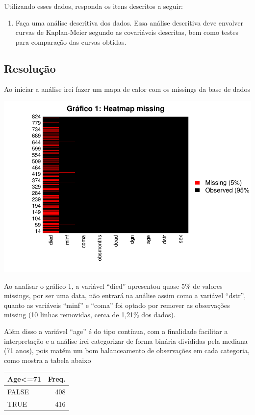 \documentclass[]{article}
\providecommand{\tightlist}{%
  \setlength{\itemsep}{0pt}\setlength{\parskip}{0pt}}
\begin{document}
Utilizando esses dados, responda os itens descritos a seguir:

\begin{enumerate}
\def\labelenumi{(\alph{enumi})}
\tightlist
\item
  Faça uma análise descritiva dos dados. Essa análise descritiva deve
  envolver curvas de Kaplan-Meier segundo as covariáveis descritas, bem
  como testes para comparação das curvas obtidas.
\end{enumerate}

\newpage

\subsection{Resolução}\label{resolucao}

Ao iniciar a análise irei fazer um mapa de calor com os missings da base
de dados

\begin{center}\includegraphics[width=0.6\linewidth]{Atividade_3_files/figure-latex/unnamed-chunk-1-1} \end{center}

Ao analisar o gráfico 1, a variável ``died'' apresentou quase 5\% de
valores missings, por ser uma data, não entrará na análise assim como a
variável ``dstr'', quanto as variáveis ``minf'' e ``coma'' foi optado
por remover as observações missing (10 linhas removidas, cerca de 1,21\%
dos dados).

Além disso a variável ``age'' é do tipo contínua, com a finalidade
facilitar a interpretação e a análise irei categorizar de forma binária
divididas pela mediana (71 anos), pois matém um bom balanceamento de
observações em cada categoria, como mostra a tabela abaixo

\begin{longtable}[]{@{}lr@{}}
\toprule
Age\textless{}=71 & Freq.\tabularnewline
\midrule
\endhead
FALSE & 408\tabularnewline
TRUE & 416\tabularnewline
\bottomrule
\end{longtable}
\end{document}
